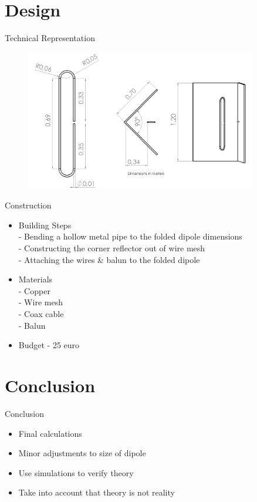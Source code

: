 \documentclass{beamer}
\begin{document}
\section{Design}
\begin{frame}{Technical Representation}
\begin{figure}
\includegraphics[width=0.9\textwidth]{Folded_dipole_3.PNG}
\end{figure}
\end{frame}

\begin{frame}{Construction}
\begin{itemize}
\item{Building Steps} \\
- Bending a hollow metal pipe to the folded dipole dimensions\\
- Constructing the corner reflector out of wire mesh\\
- Attaching the wires \& balun to the folded dipole\\
\item{Materials}\\
- Copper\\
- Wire mesh\\
- Coax cable\\
- Balun
\item Budget
- 25 euro
\end{itemize}
\end{frame}
\section{Conclusion}
\begin{frame}{Conclusion}
\begin{block}{}
\begin{itemize}
\item	Final calculations
\item	Minor adjustments to size of dipole
\item   Use simulations to verify theory
\item   Take into account that theory is not reality

\end{itemize}
\end{block}


\end{frame}
\end{document}
